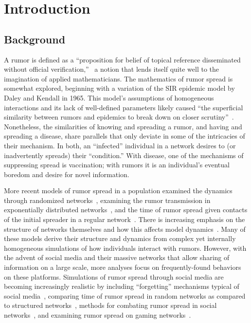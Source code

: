 \section{Introduction }
\label{sec:introduction}

\subsection{Background}
\label{subsec:background}

A rumor is defined as a ``proposition for belief of topical reference disseminated without official verification,''~\cite{knapp-1944} a notion that lends itself quite well to the imagination of applied mathematicians.
The mathematics of rumor spread is somewhat explored, beginning with a variation of the SIR epidemic model by Daley and Kendall in 1965.
This model's assumptions of homogeneous interactions and its lack of well-defined parameters likely caused ``the superficial similarity between rumors and epidemics to break down on closer scrutiny''~\cite{daley-1965}.
Nonetheless, the similarities of knowing and spreading a rumor, and having and spreading a disease, share parallels that only deviate in some of the intricacies of their mechanism.
In both, an ``infected'' individual in a network desires to (or inadvertently spreads) their ``condition.''
With disease, one of the mechanisms of suppressing spread is vaccination; with rumors it is an individual's eventual boredom and desire for novel information.

More recent models of rumor spread in a population examined the dynamics through randomized networks~\cite{karp-2000}, examining the rumor transmission in exponentially distributed networks~\cite{moreno-2004}, and the time of rumor spread given contacts of the initial spreader in a regular network~\cite{fount-2010}.
There is increasing emphasis on the structure of networks themselves and how this affects model dynamics~\cite{zhang-2013, pellis-2015, pellis-2012, zhou-2007}.
Many of these models derive their structure and dynamics from complex yet internally homogeneous simulations of how individuals interact with rumors.
However, with the advent of social media and their massive networks that allow sharing of information on a large scale, more analyses focus on frequently-found behaviors on these platforms.
Simulations of rumor spread through social media are becoming increasingly realistic by including ``forgetting'' mechanisms typical of social media~\cite{zhao-2011}, comparing time of rumor spread in random networks as compared to structured networks~\cite{liu-2011}, methods for combating rumor spread in social networks~\cite{tripathy-2010}, and examining rumor spread on gaming networks~\cite{grab-2008}.

